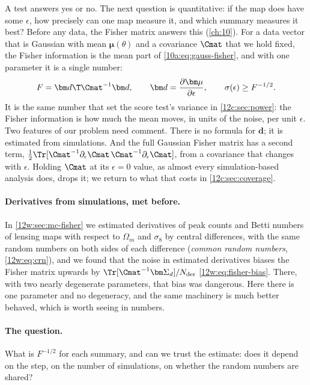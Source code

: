 A test answers yes or no. The next question is quantitative: if the map does have some $\epsilon$, how precisely can one map
measure it, and which summary measures it best? Before any data, the Fisher matrix answers this (\cref{ch:10}). For a data
vector that is Gaussian with mean $\bm\mu(\theta)$ and a covariance $\Cmat$ that we hold fixed, the Fisher information is the
mean part of \eqref{10a:eq:gauss-fisher}, and with one parameter it is a single number:
\begin{equation}
  F=\bm d\T\Cmat^{-1}\bm d,\qquad \bm d=\frac{\partial\bm\mu}{\partial\epsilon},\qquad \sigma(\epsilon)\ge F^{-1/2} .
  \label{12c:eq:fisher}
\end{equation}
It is the same number that set the score test's variance in \cref{12c:sec:power}: the Fisher information is how much the mean
moves, in units of the noise, per unit $\epsilon$. Two features of our problem need comment. There is no formula for $\bm d$; it is
estimated from simulations. And the full Gaussian Fisher matrix has a second term, $\frac12\Tr[\Cmat^{-1}\partial_\epsilon\Cmat\,
\Cmat^{-1}\partial_\epsilon\Cmat]$, from a covariance that changes with $\epsilon$. Holding $\Cmat$ at its $\epsilon=0$ value, as
almost every simulation-based analysis does, drops it; we return to what that costs in \cref{12c:sec:coverage}.

\paragraph{Derivatives from simulations, met before.} In \cref{12w:sec:mc-fisher} we estimated derivatives of peak counts and
Betti numbers of lensing maps with respect to $\Omega_m$ and $\sigma_8$ by central differences, with the same random numbers on
both sides of each difference (\emph{common random numbers}, \eqref{12w:eq:crn}), and we found that the noise in estimated
derivatives biases the Fisher matrix upwards by $\Tr[\Cmat^{-1}\bm\Sigma_d]/N_{\rm der}$ \eqref{12w:eq:fisher-bias}. There,
with two nearly degenerate parameters, that bias was dangerous. Here there is one parameter and no degeneracy, and the same
machinery is much better behaved, which is worth seeing in numbers.

\paragraph{The question.} What is $F^{-1/2}$ for each summary, and can we trust the estimate: does it depend on the step, on the
number of simulations, on whether the random numbers are shared?

